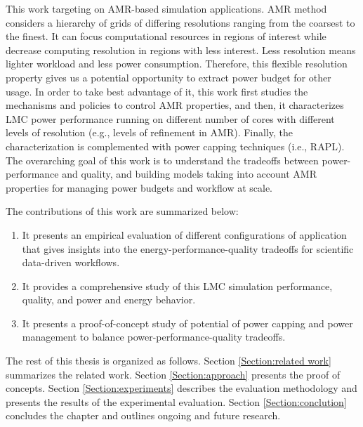 This work targeting on AMR-based simulation applications. AMR method considers a hierarchy of grids of differing resolutions ranging from the coarsest to the finest. It can focus computational resources in regions of interest while decrease computing resolution in regions with less interest. Less resolution means lighter workload and less power consumption. Therefore, this flexible resolution property gives us a potential opportunity to extract power budget for other usage. In order to take best advantage of it, this work first studies the mechanisms and policies to control AMR properties, and then, it characterizes LMC power performance running on different number of cores with different levels of resolution (e.g., levels of refinement in AMR). Finally, the characterization is complemented with power capping techniques (i.e., RAPL). The overarching goal of this work is to understand the tradeoffs between power-performance and quality, and building models taking into account AMR properties for managing power budgets and workflow at scale.

The contributions of this work are summarized below:
\begin{enumerate}
\item It presents an empirical evaluation of different configurations of application that gives insights into the energy-performance-quality tradeoffs for scientific data-driven workflows. 
\item It provides a comprehensive study of this LMC simulation performance, quality, and power and energy behavior.
\item It presents a proof-of-concept study of potential of power capping and power management to balance power-performance-quality tradeoffs.
\end{enumerate}


The rest of this thesis is organized as follows. Section \ref{Section:related work} summarizes the related work. Section \ref{Section:approach} presents the proof of concepts. Section \ref{Section:experiments} describes the evaluation methodology and presents the results of the experimental evaluation. Section \ref{Section:conclution} concludes the chapter and outlines ongoing and future research.


